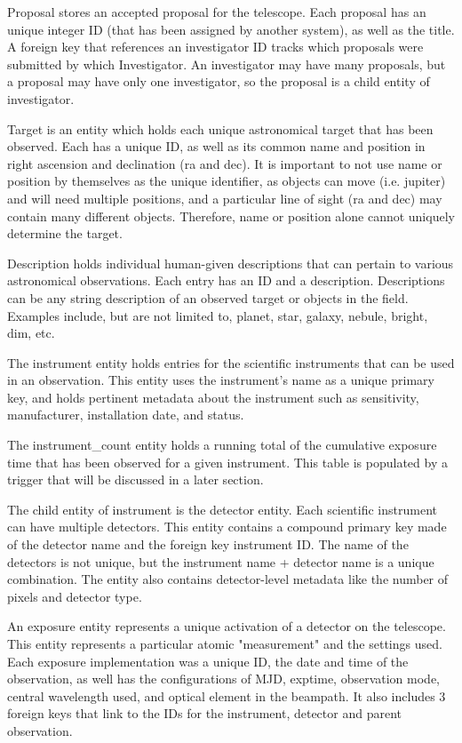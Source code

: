 \documentclass[a4paper,11pt]{article}
\begin{document}
Proposal stores an accepted proposal for the telescope.  Each proposal has an unique integer ID (that has been assigned by another system), as well as the title.  A foreign key that references an investigator ID tracks which proposals were submitted by which Investigator.  An investigator may have many proposals, but a proposal may have only one investigator, so the proposal is a child entity of investigator.

Target is an entity which holds each unique astronomical target that has been observed.  Each has a unique ID, as well as its common name and position in right ascension and declination (ra and dec).  It is important to not use name or position by themselves as the unique identifier, as objects can move (i.e. jupiter) and will need multiple positions, and a particular line of sight (ra and dec) may contain many different objects.  Therefore, name or position alone cannot uniquely determine the target.   

Description holds individual human-given descriptions that can pertain to various astronomical observations.  Each entry has an ID and a description.  Descriptions can be any string description of an observed target or objects in the field.  Examples include, but are not limited to, planet, star, galaxy, nebule, bright, dim, etc.

The instrument entity holds entries for the scientific instruments that can be used in an observation.  This entity uses the instrument's name as a unique primary key, and holds pertinent metadata about the instrument such as sensitivity, manufacturer, installation date, and status.  

The instrument\_count entity holds a running total of the cumulative exposure time that has been observed for a given instrument.  This table is populated by a trigger that will be discussed in a later section.

The child entity of instrument is the detector entity.  Each scientific instrument can have multiple detectors.  This entity contains a compound primary key made of the detector name and the foreign key instrument ID.  The name of the detectors is not unique, but the instrument name + detector name is a unique combination.  The entity also contains detector-level metadata like the number of pixels and detector type.  

An exposure entity represents a unique activation of a detector on the telescope.  This entity represents a particular atomic "measurement" and the settings used.  Each exposure implementation was a unique ID, the date and time of the observation, as well has the configurations of MJD, exptime, observation mode, central wavelength used, and optical element in the beampath.  It also includes 3 foreign keys that link to the IDs for the instrument, detector and parent observation.
\end{document}
